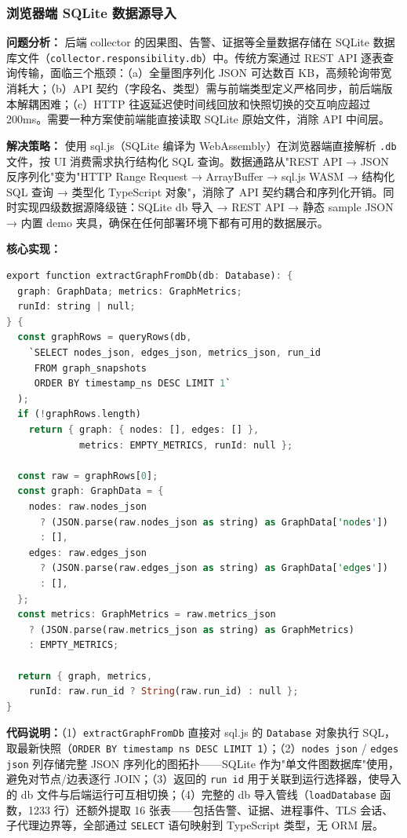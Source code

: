 \documentclass[a4paper]{ctexart}
\makeatletter
\renewcommand{\_}{%
  \ifmmode
    \nfss@text{\textunderscore}%
  \else
    \textunderscore\discretionary{}{}{}%
  \fi}
\makeatother
\begin{document}
\subsubsection{浏览器端 SQLite 数据源导入}

\textbf{问题分析：} 后端 collector 的因果图、告警、证据等全量数据存储在 SQLite 数据库文件（\texttt{collector.responsibility.db}）中。传统方案通过 REST API 逐表查询传输，面临三个瓶颈：（a）全量图序列化 JSON 可达数百 KB，高频轮询带宽消耗大；（b）API 契约（字段名、类型）需与前端类型定义严格同步，前后端版本解耦困难；（c）HTTP 往返延迟使时间线回放和快照切换的交互响应超过 200ms。需要一种方案使前端能直接读取 SQLite 原始文件，消除 API 中间层。

\textbf{解决策略：} 使用 sql.js（SQLite 编译为 WebAssembly）在浏览器端直接解析 \texttt{.db} 文件，按 UI 消费需求执行结构化 SQL 查询。数据通路从"REST API → JSON 反序列化"变为"HTTP Range Request → ArrayBuffer → sql.js WASM → 结构化 SQL 查询 → 类型化 TypeScript 对象"，消除了 API 契约耦合和序列化开销。同时实现四级数据源降级链：SQLite db 导入 → REST API → 静态 sample JSON → 内置 demo 夹具，确保在任何部署环境下都有可用的数据展示。

\textbf{核心实现：}

\begin{lstlisting}[language={Rust}, caption={// frontend/lib/db-import.ts — sql.js 浏览器端 SQLite 图快照提取}]
export function extractGraphFromDb(db: Database): {
  graph: GraphData; metrics: GraphMetrics;
  runId: string | null;
} {
  const graphRows = queryRows(db,
    `SELECT nodes_json, edges_json, metrics_json, run_id
     FROM graph_snapshots
     ORDER BY timestamp_ns DESC LIMIT 1`
  );
  if (!graphRows.length)
    return { graph: { nodes: [], edges: [] },
             metrics: EMPTY_METRICS, runId: null };

  const raw = graphRows[0];
  const graph: GraphData = {
    nodes: raw.nodes_json
      ? (JSON.parse(raw.nodes_json as string) as GraphData['nodes'])
      : [],
    edges: raw.edges_json
      ? (JSON.parse(raw.edges_json as string) as GraphData['edges'])
      : [],
  };
  const metrics: GraphMetrics = raw.metrics_json
    ? (JSON.parse(raw.metrics_json as string) as GraphMetrics)
    : EMPTY_METRICS;

  return { graph, metrics,
    runId: raw.run_id ? String(raw.run_id) : null };
}
\end{lstlisting}

\textbf{代码说明：}（1）\texttt{extractGraphFromDb} 直接对 sql.js 的 \texttt{Database} 对象执行 SQL，取最新快照（\texttt{ORDER BY timestamp\_ns DESC LIMIT 1}）；（2）\texttt{nodes\_json} / \texttt{edges\_json} 列存储完整 JSON 序列化的图拓扑——SQLite 作为"单文件图数据库"使用，避免对节点/边表逐行 JOIN；（3）返回的 \texttt{run\_id} 用于关联到运行选择器，使导入的 db 文件与后端运行可互相切换；（4）完整的 db 导入管线（\texttt{loadDatabase} 函数，1233 行）还额外提取 16 张表——包括告警、证据、进程事件、TLS 会话、子代理边界等，全部通过 \texttt{SELECT} 语句映射到 TypeScript 类型，无 ORM 层。
\end{document}
